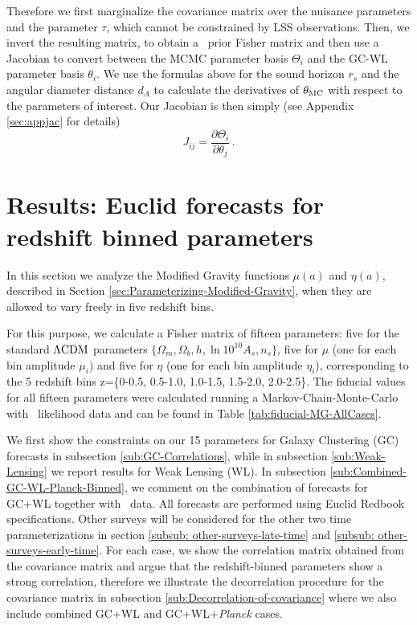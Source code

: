 Therefore we first marginalize the covariance matrix over the nuisance
parameters and the parameter $\tau$, which cannot be constrained
by LSS observations. Then, we invert the resulting matrix, to obtain a \planck\
prior Fisher matrix and then use a Jacobian to convert between the
MCMC parameter basis $\Theta_{i}$ and the GC-WL parameter basis $\theta_{i}$.
We use the formulas above for the sound horizon $r_{s}$ and the angular
diameter distance $d_{A}$ to calculate the derivatives of $\theta_{\rm MC}$
with respect to the parameters of interest. Our Jacobian is then simply (see Appendix \ref{sec:appjac} for details)
\begin{equation}
J_{ij}=\frac{\partial\Theta_{i}}{\partial\theta_{j}} \, .
\end{equation}

\section{\label{sec:Results:-Redshift-Binned}Results: Euclid forecasts for redshift binned parameters}
In this section we analyze the Modified Gravity functions $\mu(a)$ and $\eta(a)$,
described in Section \ref{sec:Parameterizing-Modified-Gravity}, when they are allowed
to vary freely in five redshift bins.

For this purpose, we calculate a Fisher matrix of fifteen parameters:
five for the standard $\Lambda\mathrm{CDM}$ parameters $\{\Omega_{m},\Omega_{b},h,\ln10^{10}A_{s},n_{s}\}$,
five for $\mu$ (one
for each bin amplitude $\mu_{i}$) and five for $\eta$ (one for each
bin amplitude $\eta_{i}$), corresponding to the 5 redshift bins z=\{0-0.5, 0.5-1.0, 1.0-1.5, 1.5-2.0, 2.0-2.5\}. 
The fiducial values for all fifteen parameters
were calculated running a Markov-Chain-Monte-Carlo with \planck\ likelihood
data and can be found in Table \ref{tab:fiducial-MG-AllCases}.

We first show the constraints on our 15 parameters for Galaxy Clustering (GC) forecasts in subsection \ref{sub:GC-Correlations},
while in subsection \ref{sub:Weak-Lensing} we report results for Weak Lensing (WL). In subsection \ref{sub:Combined-GC-WL-Planck-Binned}, we
comment on the combination of forecasts for GC+WL together with \planck\ data.
All forecasts are performed using Euclid Redbook specifications. 
Other surveys 
will be considered for the other two time parameterizations in section \ref{subsub: other-surveys-late-time} and 
\ref{subsub: other-surveys-early-time}. 
For each case, we show the correlation matrix obtained from the covariance matrix and argue that 
the redshift-binned
parameters show a strong correlation, therefore we illustrate the decorrelation
procedure for the covariance matrix in subsection \ref{sub:Decorrelation-of-covariance}
where we also include combined GC+WL and GC+WL+{\it Planck} cases.



